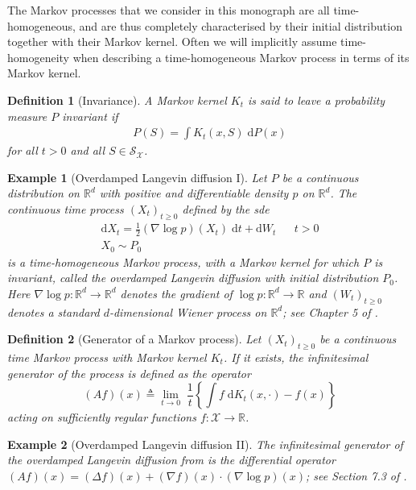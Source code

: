 \documentclass[12pt,paper=letter]{scrreprt}
\newtheorem{definition}{Definition}[chapter]
\newtheorem{example}{Example}[chapter]
\def\defeq{\triangleq} %
\begin{document}
\noindent The Markov processes that we consider in this monograph are all time-homogeneous, and are thus completely characterised by their initial distribution together with their Markov kernel.
Often we will implicitly assume time-homogeneity when describing a time-homogeneous Markov process in terms of its Markov kernel.

\begin{definition}[Invariance]
\label{def: invariant}
A Markov kernel $K_t$ is said to leave a probability measure $P$ \emph{invariant} if 
\begin{align*}
P(S) = \int K_t(x,S) \; \mathrm{d}P(x) 
\end{align*}
for all $t > 0$ and all $S \in \mathcal{S}_{\mathcal{X}}$.
\end{definition}

\begin{example}[Overdamped Langevin diffusion I]
\label{ex: overdamped Langevin}
Let $P$ be a continuous distribution on $\mathbb{R}^d$ with positive and differentiable density $p$ on $\mathbb{R}^d$.
The continuous time process $(X_t)_{t \geq 0}$ defined by the \ac{sde}
\begin{align*}
\mathrm{d}X_t = \frac{1}{2} (\nabla \log p)(X_t) \; \mathrm{d}t + \mathrm{d}W_t & & t > 0 \\
X_0 \sim P_0 & &
\end{align*}
is a time-homogeneous Markov process, with a Markov kernel for which $P$ is invariant, called the \emph{overdamped Langevin diffusion} with \emph{initial distribution} $P_0$.
Here $\nabla \log p : \mathbb{R}^d \rightarrow \mathbb{R}^d$ denotes the gradient of $\log p : \mathbb{R}^d \rightarrow \mathbb{R}$ and $(W_t)_{t \geq 0}$ denotes a standard $d$-dimensional Wiener process on $\mathbb{R}^d$; see Chapter 5 of \citet{oksendal2013stochastic}.
\end{example}


\begin{definition}[Generator of a Markov process]
\label{def: generator}
Let $(X_t)_{t \geq 0}$ be a continuous time Markov process with Markov kernel $K_t$.
If it exists, the \emph{infinitesimal generator} of the process is defined as the operator
$$
(A f)(x) \defeq \lim_{t \rightarrow 0} \; \frac{1}{t} \left\{ \int f \; \mathrm{d} K_t(x,\cdot) - f(x) \right\}
$$
acting on sufficiently regular functions $f : \mathcal{X} \rightarrow \mathbb{R}$.
\end{definition}

\begin{example}[Overdamped Langevin diffusion II]
\label{ex: overdamped II}
The infinitesimal generator of the overdamped Langevin diffusion from  is the differential operator $(A f)(x) = (\Delta f)(x) + (\nabla f)(x) \cdot (\nabla \log p)(x)$; see Section 7.3 of \citet{oksendal2013stochastic}.
\end{example}
\end{document}
